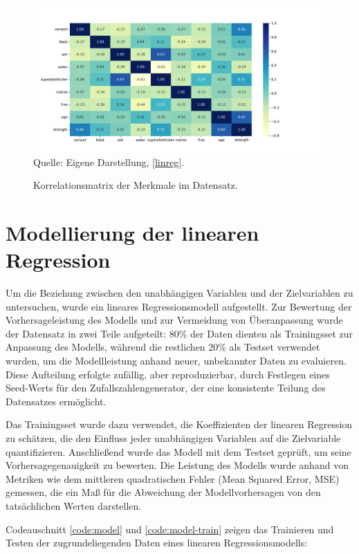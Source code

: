 \begin{figure}[h]
    \caption{Korrelationsmatrix der Merkmale im Datensatz.}
    \includegraphics[width=1\textwidth]{../scripts/images/corr.png}
    Quelle: Eigene Darstellung, \ref{linreg}.
    \label{pic:corr}
\end{figure}

\section{Modellierung der linearen Regression}

Um die Beziehung zwischen den unabhängigen Variablen und der Zielvariablen  zu untersuchen, 
wurde ein lineares Regressionsmodell aufgestellt. 
Zur Bewertung der Vorhersageleistung des Modells und zur Vermeidung von Überanpassung wurde der 
Datensatz in zwei Teile aufgeteilt: 80\% der Daten dienten als Trainingsset zur 
Anpassung des Modells, während die restlichen 20\% als Testset verwendet wurden, 
um die Modellleistung anhand neuer, unbekannter Daten zu evaluieren. 
Diese Aufteilung erfolgte zufällig, aber reproduzierbar, durch Festlegen eines Seed-Werts 
für den Zufallszahlengenerator, der eine konsistente Teilung des Datensatzes ermöglicht.

Das Trainingsset wurde dazu verwendet, die Koeffizienten der linearen Regression zu schätzen, 
die den Einfluss jeder unabhängigen Variablen auf die Zielvariable quantifizieren. 
Anschließend wurde das Modell mit dem Testset geprüft, um seine Vorhersagegenauigkeit zu bewerten. 
Die Leistung des Modells wurde anhand von Metriken wie dem mittleren quadratischen Fehler (Mean Squared Error, MSE) gemessen, 
die ein Maß für die Abweichung der Modellvorhersagen von den tatsächlichen Werten darstellen.

Codeauschnitt \ref{code:model} und \ref{code:model-train} zeigen das Trainieren und Testen der zugrundeliegenden Daten 
eines linearen Regressionsmodells:

